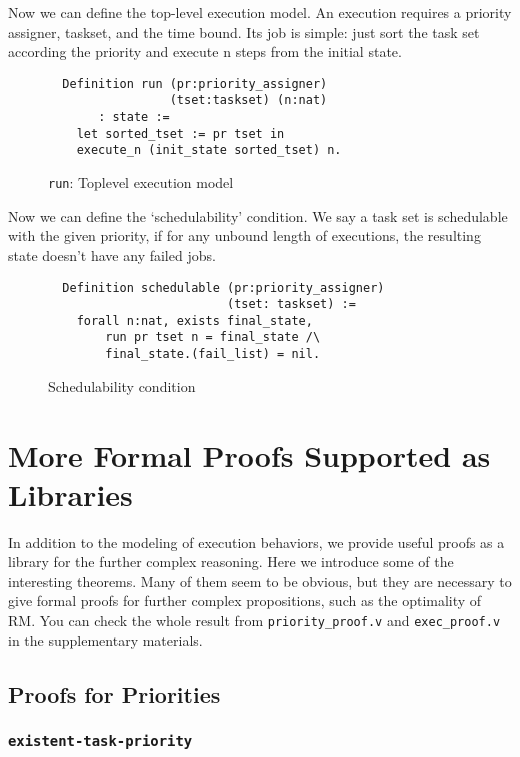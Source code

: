\documentclass[nocopyrightspace]{sigplanconf}
\begin{document}
Now we can define the top-level execution model. An execution requires a priority assigner, taskset, and the time bound. Its
job is simple: just sort the task set according the priority and execute n steps from the initial state.

\begin{figure}[H]
\begin{verbatim}
  Definition run (pr:priority_assigner)
                 (tset:taskset) (n:nat)
       : state :=
    let sorted_tset := pr tset in
    execute_n (init_state sorted_tset) n.
\end{verbatim}
\caption{ \texttt{run}: Toplevel execution model }\label{fig:run}
\end{figure}

Now we can define the `schedulability' condition. We say a task set is schedulable with the given priority,
if for any unbound length of executions, the resulting state doesn't have any failed jobs.

\begin{figure}[H]
\begin{verbatim}
  Definition schedulable (pr:priority_assigner)
                         (tset: taskset) :=
    forall n:nat, exists final_state,
        run pr tset n = final_state /\
        final_state.(fail_list) = nil.
\end{verbatim}
\caption{ Schedulability condition }\label{fig:schedulable}
\end{figure}

\section{More Formal Proofs Supported as Libraries}

In addition to the modeling of execution behaviors, we provide useful proofs as a library for the further complex reasoning. Here we introduce some of the interesting theorems. Many of them seem to be obvious, but they are necessary to give formal proofs for further complex propositions, such as the optimality of RM. You can check the whole result from \texttt{priority\_proof.v} and \texttt{exec\_proof.v} in the supplementary materials.

\subsection{Proofs for Priorities}

\subsubsection{\texttt{existent-task-priority}}
\end{document}
